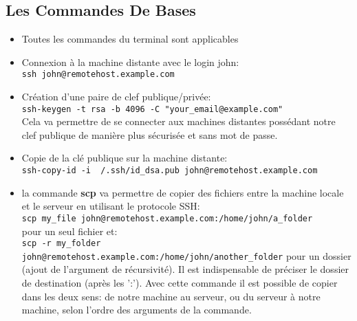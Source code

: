 \subsection{Les Commandes De Bases}
\begin{itemize}
	\item Toutes les commandes du terminal sont applicables
	\item Connexion à la machine distante avec le login john:\\
		\texttt{ssh john@remotehost.example.com}
	\item Création d'une paire de clef publique/privée:\\
		\texttt{ssh-keygen -t rsa -b 4096 -C "your_email@example.com"}\\
		Cela va permettre de se connecter aux machines distantes possédant
		notre clef publique de manière plus sécurisée et sans mot de passe.
	\item Copie de la clé publique sur la machine distante:\\
		\texttt{ssh-copy-id -i ~/.ssh/id_dsa.pub john@remotehost.example.com}
	\item la commande \textbf{scp} va permettre de copier des fichiers entre la machine locale et le
		serveur en utilisant le protocole SSH:\\
		\texttt{scp my_file john@remotehost.example.com:/home/john/a_folder}\\
		pour un seul fichier et:\\
		\texttt{scp -r my_folder john@remotehost.example.com:/home/john/another_folder} pour un dossier
		(ajout de l’argument de récursivité). Il est indispensable de préciser le
		dossier de destination (après les ':'). Avec cette commande il est
		possible de copier dans les deux sens: de notre machine au serveur, ou
		du serveur à notre machine, selon l'ordre des arguments de la commande.
\end{itemize}
